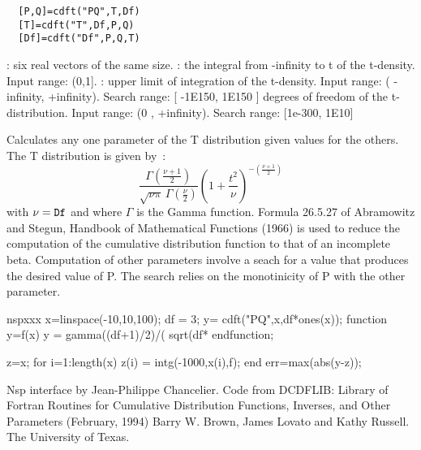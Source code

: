 \begin{mandesc}
\end{mandesc}
\label{cdft}
\begin{calling_sequence}
\begin{verbatim}
  [P,Q]=cdft("PQ",T,Df)  
  [T]=cdft("T",Df,P,Q)  
  [Df]=cdft("Df",P,Q,T)  
\end{verbatim}
\end{calling_sequence}
\begin{parameters}
  \begin{varlist}
    : six real vectors of the same size.
    : the integral from -infinity to t of the t-density. Input range: (0,1].
      : upper limit of integration of the t-density. Input range: ( -infinity, +infinity). Search range: [ -1E150, 1E150 ]
       degrees of freedom of the t-distribution. Input range: (0 , +infinity). Search range: [1e-300, 1E10]
  \end{varlist}
\end{parameters}
\begin{mandescription}
  Calculates any one parameter of the T distribution given
  values for the others. The T distribution is given by~:
  \begin{equation}
    \frac{\Gamma(\frac{\nu+1}{2})} {\sqrt{\nu\pi}\,\Gamma(\frac{\nu}{2})} \left(1+\frac{t^2}{\nu} \right)^{-(\frac{\nu+1}{2})} 
  \end{equation}
  with $\nu = \mbox{\tt Df}$  and where $\Gamma$ is the Gamma function.
  Formula  26.5.27  of   Abramowitz   and  Stegun,   Handbook   of
  Mathematical Functions  (1966) is used to reduce the computation
  of the cumulative distribution function to that of an incomplete
  beta.
  Computation of other parameters involve a seach for a value that
  produces  the desired  value  of P.   The search relies  on  the
  monotinicity of P with the other parameter.
\end{mandescription}

\begin{mintednsp}{nspxxx}
x=linspace(-10,10,100);
df = 3;
y= cdft("PQ",x,df*ones(x));
function y=f(x)
  y = gamma((df+1)/2)/( sqrt(df*%
endfunction;

z=x;
for i=1:length(x)
  z(i) = intg(-1000,x(i),f);
end
err=max(abs(y-z));
\end{mintednsp}


\begin{authors}
  Nsp interface by Jean-Philippe Chancelier. Code from DCDFLIB: 
  Library of Fortran Routines for Cumulative Distribution
  Functions, Inverses, and Other Parameters (February, 1994)
  Barry W. Brown, James Lovato and Kathy Russell. The University of Texas.
\end{authors}
